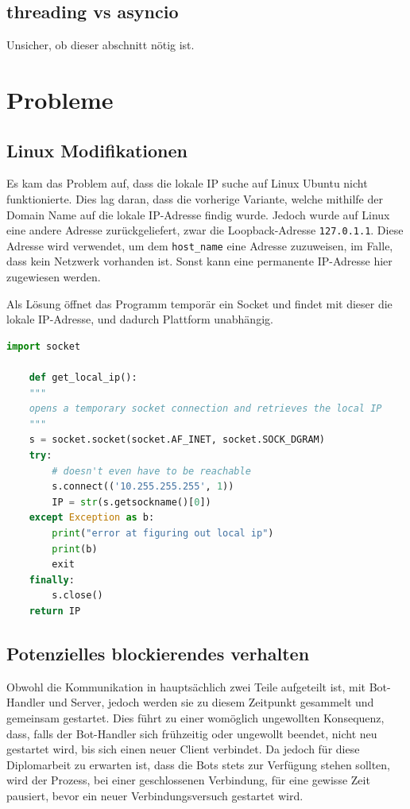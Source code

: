 \subsection{threading vs asyncio}
Unsicher, ob dieser abschnitt nötig ist.

\section{Probleme}
\subsection{Linux Modifikationen}
Es kam das Problem auf, 
dass die lokale IP suche auf Linux Ubuntu nicht funktionierte.
Dies lag daran, dass die vorherige Variante, 
welche mithilfe der Domain Name auf die lokale IP-Adresse findig wurde.
Jedoch wurde auf Linux eine andere Adresse zurückgeliefert, 
zwar die Loopback-Adresse \texttt{127.0.1.1}. 
Diese Adresse wird verwendet, um dem \texttt{host\_name} eine Adresse zuzuweisen,
im Falle, dass kein Netzwerk vorhanden ist. 
Sonst kann eine permanente IP-Adresse hier zugewiesen werden.

Als Lösung öffnet das Programm temporär ein Socket 
und findet mit dieser die lokale IP-Adresse, und dadurch Plattform unabhängig.
\begin{lstlisting}[language=python, gobble=4]
    import socket

    def get_local_ip():
    """
    opens a temporary socket connection and retrieves the local IP
    """
    s = socket.socket(socket.AF_INET, socket.SOCK_DGRAM)
    try:
        # doesn't even have to be reachable
        s.connect(('10.255.255.255', 1))
        IP = str(s.getsockname()[0])
    except Exception as b:
        print("error at figuring out local ip")
        print(b)
        exit
    finally:
        s.close()
    return IP
\end{lstlisting}

\subsection{Potenzielles blockierendes verhalten}
Obwohl die Kommunikation in hauptsächlich zwei Teile aufgeteilt ist, 
mit Bot-Handler und Server, 
jedoch werden sie zu diesem Zeitpunkt gesammelt und gemeinsam gestartet.
Dies führt zu einer womöglich ungewollten Konsequenz,
dass, falls der Bot-Handler sich frühzeitig oder ungewollt beendet, 
nicht neu gestartet wird, bis sich einen neuer Client verbindet.
% 
Da jedoch für diese Diplomarbeit zu erwarten ist, 
dass die Bots stets zur Verfügung stehen sollten,
wird der Prozess, bei einer geschlossenen Verbindung,
für eine gewisse Zeit pausiert, bevor ein neuer Verbindungsversuch gestartet wird.

